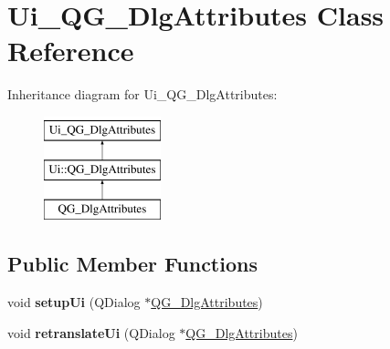 \hypertarget{classUi__QG__DlgAttributes}{\section{Ui\-\_\-\-Q\-G\-\_\-\-Dlg\-Attributes Class Reference}
\label{classUi__QG__DlgAttributes}
}
Inheritance diagram for Ui\-\_\-\-Q\-G\-\_\-\-Dlg\-Attributes\-:\begin{figure}[H]
\begin{center}
\leavevmode
\includegraphics[height=3.000000cm]{classUi__QG__DlgAttributes}
\end{center}
\end{figure}
\subsection*{Public Member Functions}
\begin{DoxyCompactItemize}
\item 
\hypertarget{classUi__QG__DlgAttributes_aafc5b45c9260e57425a215130952d67b}{void {\bfseries setup\-Ui} (Q\-Dialog $\ast$\hyperlink{classQG__DlgAttributes}{Q\-G\-\_\-\-Dlg\-Attributes})}\label{classUi__QG__DlgAttributes_aafc5b45c9260e57425a215130952d67b}

\item 
\hypertarget{classUi__QG__DlgAttributes_a4c2c1d7dba726a8e05527dc7bde0ae9c}{void {\bfseries retranslate\-Ui} (Q\-Dialog $\ast$\hyperlink{classQG__DlgAttributes}{Q\-G\-\_\-\-Dlg\-Attributes})}\label{classUi__QG__DlgAttributes_a4c2c1d7dba726a8e05527dc7bde0ae9c}

\end{DoxyCompactItemize}
